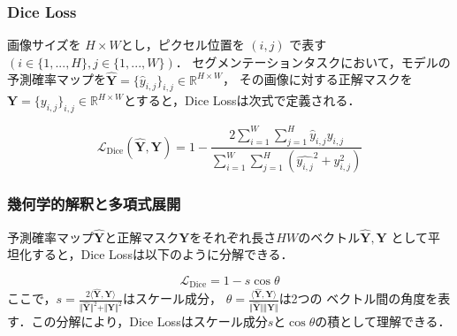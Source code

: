 \documentclass[10pt, a4paper, twocolumn]{jarticle}
\begin{document}
\subsubsection{Dice Loss}
画像サイズを $H \times W$とし，ピクセル位置を $(i, j)$ で表す$\left(i \in \{1, ..., H\}, j \in \{1, ..., W\}\right)$．
セグメンテーションタスクにおいて，モデルの予測確率マップを$\hat{\mathbf{Y}} = \{\hat{y}_{i,j}\}_{i,j} \in \mathbb R ^ {H \times W}$，
その画像に対する正解マスクを$\mathbf{Y} = \{{y}_{i,j}\}_{i,j} \in \mathbb R ^ {H \times W}$とすると，Dice Lossは次式で定義される．

\begin{equation}
  \mathcal{L}_{\text{Dice}}(\hat{\mathbf{Y}}, \mathbf{Y}) = 1 - \frac{2 \sum_{i=1}^{W} \sum_{j=1}^{H} \hat{y}_{i, j} y_{i, j}}{\sum_{i=1}^{W} \sum_{j=1}^{H}(\hat{y_{i, j}} ^ 2 + y_{i, j} ^ 2)}
\end{equation}

\subsubsection{幾何学的解釈と多項式展開}

予測確率マップ$\hat{\mathbf{Y}}$と正解マスク$\mathbf{Y}$をそれぞれ長さ$HW$のベクトル$\hat{\mathbf{Y}}, \mathbf{Y}$
として平坦化すると，Dice Lossは以下のように分解できる．

\begin{equation}
  \mathcal{L}_{\text{Dice}} = 1 - s \cos  \theta
\end{equation}
ここで，$s = \frac{2 \langle \hat{\mathbf{Y}}, {\mathbf{Y}} \rangle}{\Vert \hat{\mathbf{Y}} \Vert ^ 2 + \Vert {\mathbf{Y}} \Vert ^ 2}$はスケール成分，
$\theta = \frac{\langle \hat{\mathbf{Y}}, {\mathbf{Y}}\rangle}{\Vert \hat{\mathbf{Y}} \Vert \Vert {\mathbf{Y}}\Vert}$は2つの
ベクトル間の角度を表す．この分解により，Dice Lossはスケール成分$s$と$\cos \theta$の積として理解できる．
\end{document}
